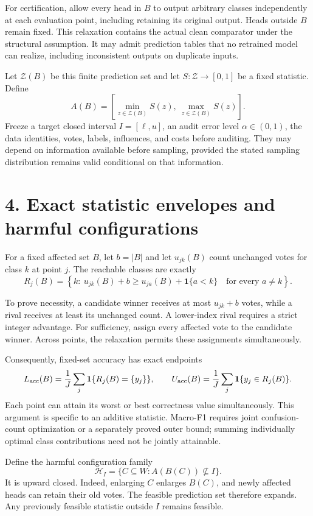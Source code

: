 \documentclass[11pt]{article}
\begin{document}
For certification, allow every head in $B$ to output arbitrary classes independently at each evaluation point, including retaining its original output. Heads outside $B$ remain fixed. This relaxation contains the actual clean comparator under the structural assumption. It may admit prediction tables that no retrained model can realize, including inconsistent outputs on duplicate inputs.

Let $\mathcal Z(B)$ be this finite prediction set and let $S:\mathcal Z\to[0,1]$ be a fixed statistic. Define
\[
A(B)=\left[\min_{z\in\mathcal Z(B)}S(z),\ \max_{z\in\mathcal Z(B)}S(z)\right].
\]
Freeze a target closed interval $I=[\ell,u]$, an audit error level $\alpha\in(0,1)$, the data identities, votes, labels, influences, and costs before auditing. They may depend on information available before sampling, provided the stated sampling distribution remains valid conditional on that information.

\section*{4. Exact statistic envelopes and harmful configurations}

For a fixed affected set $B$, let $b=|B|$ and let $u_{jk}(B)$ count unchanged votes for class $k$ at point $j$. The reachable classes are exactly
\[
R_j(B)=\left\{k:\ u_{jk}(B)+b\ge u_{ja}(B)+\mathbf1\{a<k\}
\quad\text{for every }a\ne k\right\}.
\]

To prove necessity, a candidate winner receives at most $u_{jk}+b$ votes, while a rival receives at least its unchanged count. A lower-index rival requires a strict integer advantage. For sufficiency, assign every affected vote to the candidate winner. Across points, the relaxation permits these assignments simultaneously.

Consequently, fixed-set accuracy has exact endpoints
\[
L_{\rm acc}(B)=\frac1J\sum_j\mathbf1\{R_j(B)=\{y_j\}\},\qquad
U_{\rm acc}(B)=\frac1J\sum_j\mathbf1\{y_j\in R_j(B)\}.
\]
Each point can attain its worst or best correctness value simultaneously. This argument is specific to an additive statistic. Macro-F1 requires joint confusion-count optimization or a separately proved outer bound; summing individually optimal class contributions need not be jointly attainable.

Define the harmful configuration family
\[
\mathcal H_I=\{C\subseteq W:A(B(C))\not\subseteq I\}.
\]
It is upward closed. Indeed, enlarging $C$ enlarges $B(C)$, and newly affected heads can retain their old votes. The feasible prediction set therefore expands. Any previously feasible statistic outside $I$ remains feasible.
\end{document}
